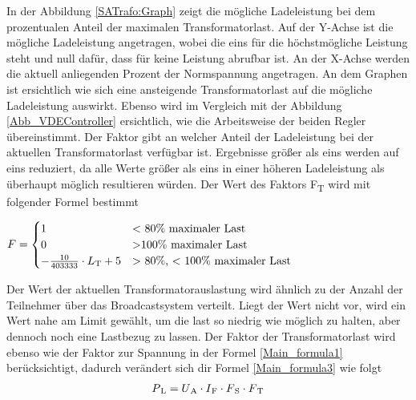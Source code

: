In der Abbildung \ref{SATrafo:Graph} zeigt die mögliche Ladeleistung bei dem prozentualen Anteil der maximalen Transformatorlast. Auf der Y-Achse ist die mögliche Ladeleistung angetragen, wobei die eins für die höchstmögliche Leistung steht und null dafür, dass für keine Leistung abrufbar ist. An der X-Achse werden die aktuell anliegenden Prozent der Normspannung angetragen. An dem Graphen ist ersichtlich wie sich eine ansteigende Transformatorlast auf die mögliche Ladeleistung auswirkt. Ebenso wird im Vergleich mit der Abbildung \ref{Abb_VDEController} ersichtlich, wie die Arbeitsweise der beiden Regler übereinstimmt. Der Faktor gibt an welcher Anteil der Ladeleistung bei der aktuellen Transformatorlast verfügbar ist. Ergebnisse größer als eins werden auf eins reduziert, da alle Werte größer als eins in einer höheren Ladeleistung als überhaupt möglich resultieren würden. Der Wert des Faktors F\textsubscript{T} wird mit folgender Formel bestimmt \\
\begin{center}
	$ F = \begin{cases}
	1 &  \text{$<$ 80\% maximaler Last} \\
	0 &  \text{$>$100\% maximaler Last} \\
	- \frac{10}{403333} \cdot L\textsubscript{T} + 5 & \text{$>$ 80\%, $<$ 100\% maximaler Last}
	\end{cases}$
\end{center}
Der Wert der aktuellen Transformatorauslastung wird ähnlich zu der Anzahl der Teilnehmer über das Broadcastsystem verteilt. Liegt der Wert nicht vor, wird ein Wert nahe am Limit gewählt, um die last so niedrig wie möglich zu halten, aber dennoch noch eine Lastbezug zu lassen. Der Faktor der Transformatorlast wird ebenso wie der Faktor zur Spannung in der Formel \ref{Main_formula1} berücksichtigt, dadurch verändert sich dir Formel \ref{Main_formula3} wie folgt
\begin{align}
	P\textsubscript{L} = U\textsubscript{A} \cdot I\textsubscript{F} \cdot F\textsubscript{S} \cdot F\textsubscript{T} \label{Main_formula4}
\end{align}

